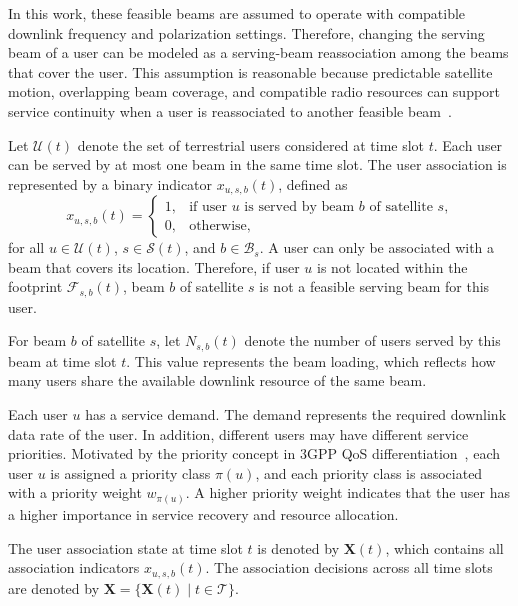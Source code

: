 In this work, these feasible beams are assumed to operate with compatible downlink frequency and polarization settings. Therefore, changing the serving beam of a user can be modeled as a serving-beam reassociation among the beams that cover the user. This assumption is reasonable because predictable satellite motion, overlapping beam coverage, and compatible radio resources can support service continuity when a user is reassociated to another feasible beam~\cite{juan2022handover,alansi2024handover,gonzalezgarrido2025joint,christopoulos2013multibeam}.

Let $\mathcal{U}(t)$ denote the set of terrestrial users considered at time slot $t$. Each user can be served by at most one beam in the same time slot. The user association is represented by a binary indicator $x_{u,s,b}(t)$, defined as
\begin{equation*}
x_{u,s,b}(t)=
\begin{cases}
1, & \text{if user $u$ is served by beam $b$ of satellite $s$,}\\
0, & \text{otherwise,}
\end{cases}
\end{equation*}
for all $u\in\mathcal{U}(t)$, $s\in\mathcal{S}(t)$, and $b\in\mathcal{B}_s$. A user can only be associated with a beam that covers its location. Therefore, if user $u$ is not located within the footprint $\mathcal{F}_{s,b}(t)$, beam $b$ of satellite $s$ is not a feasible serving beam for this user.

For beam $b$ of satellite $s$, let $N_{s,b}(t)$ denote the number of users served by this beam at time slot $t$. This value represents the beam loading, which reflects how many users share the available downlink resource of the same beam.

Each user $u$ has a service demand. The demand represents the required downlink data rate of the user. In addition, different users may have different service priorities. Motivated by the priority concept in 3GPP QoS differentiation~\cite{etsi_ts123501_2022}, each user $u$ is assigned a priority class $\pi(u)$, and each priority class is associated with a priority weight $w_{\pi(u)}$. A higher priority weight indicates that the user has a higher importance in service recovery and resource allocation.

The user association state at time slot $t$ is denoted by $\mathbf{X}(t)$, which contains all association indicators $x_{u,s,b}(t)$. The association decisions across all time slots are denoted by $\mathbf{X}=\{\mathbf{X}(t)\mid t\in\mathcal{T}\}$.

